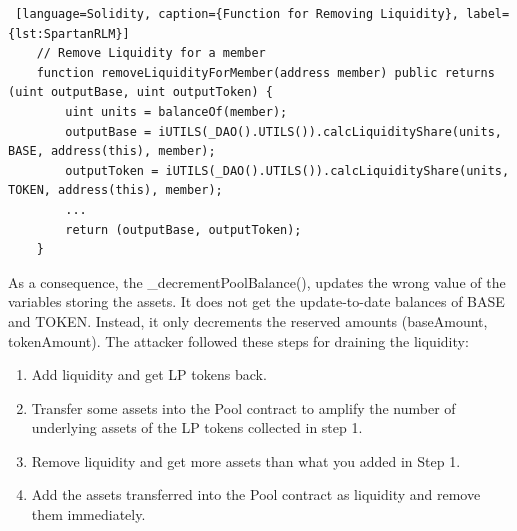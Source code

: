 \begin{lstlisting} [language=Solidity, caption={Function for Removing Liquidity}, label={lst:SpartanRLM}]
    // Remove Liquidity for a member
    function removeLiquidityForMember(address member) public returns (uint outputBase, uint outputToken) {
        uint units = balanceOf(member);
        outputBase = iUTILS(_DAO().UTILS()).calcLiquidityShare(units, BASE, address(this), member);
        outputToken = iUTILS(_DAO().UTILS()).calcLiquidityShare(units, TOKEN, address(this), member);
        ...
        return (outputBase, outputToken);
    }
\end{lstlisting}
As a consequence, the \_decrementPoolBalance(), updates the  wrong value of the variables storing the assets. 
It does not get the update-to-date balances of BASE and TOKEN. Instead, it only decrements the reserved amounts (baseAmount, tokenAmount).
The attacker followed these steps for draining the liquidity:
\begin{enumerate}
    \item Add liquidity and get LP tokens back.
    \item Transfer some assets into the Pool contract to amplify the number of underlying assets of the LP tokens collected in step 1.
    \item Remove liquidity and get more assets than what you added in Step 1.
    \item Add the assets transferred into the Pool contract as liquidity and remove them immediately.
\end{enumerate}


